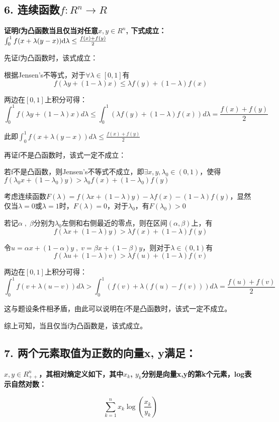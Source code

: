 \documentclass[]{article}
\begin{document}
\hypertarget{header-n106}{%
\subsection{6. 连续函数$f:R^n→R$}\label{header-n106}}

\textbf{证明f为凸函数当且仅当对任意$x,y\in R^n$, 下式成立：$\int_0^1 f(x+\lambda(y-x)){\rm d}\lambda \leq \frac{f(x)+f(y)}{2}$}

先证f为凸函数时，该式成立：

根据Jensen's不等式，对于$\forall \lambda \in[0,1]$有
$$
f(\lambda y +(1-\lambda)x)\leq \lambda f(y) +(1-\lambda)f(x)
$$

两边在$[0,1]$上积分可得：
$$
\int_0^1 f(\lambda y +(1-\lambda)x) d\lambda \leq \int_0^1 (\lambda f(y) +(1-\lambda)f(x))d\lambda=\frac{f(x)+f(y)}{2}
$$

此即$\int_0^1 f(x +\lambda(y-x)) d\lambda \leq \frac{f(x)+f(y)}{2}$

再证f不是凸函数时，该式一定不成立：

若f不是凸函数，则Jensen's不等式不成立，即$\exists x,y,\lambda_0 \in (0,1)$，使得$f(\lambda_0x+(1-\lambda_0)y)>\lambda_0f(x)+(1-\lambda_0)f(y)$

考虑连续函数$F(\lambda)=f(\lambda x+(1-\lambda)y)-\lambda f(x)-(1-\lambda)f(y)$，显然仅当$\lambda=0$或$\lambda=1$时，$F(\lambda)=0$，对于$\lambda_0$，有$F(\lambda_0)>0$

若记$\alpha\;,\;\beta$分别为$\lambda_0$左侧和右侧最近的零点，则在区间$(\alpha,\beta)$上，有
$$
f(\lambda x +(1-\lambda)y)>\lambda f(x) + (1-\lambda)f(y)
$$

令$u=\alpha x +(1-\alpha)y\;,\;v=\beta x+(1-\beta)y$，则对于$\lambda \in (0,1)$有
$$
f(\lambda u +(1-\lambda)v)>\lambda f(u) +(1-\lambda)f(v)
$$

两边在$[0,1]$上积分可得：
$$
\int_0^1 f(v+\lambda (u-v))d\lambda>\int_0^1 (f(v)+\lambda(f(u)-f(v)))d\lambda=\frac{f(u)+f(v)}{2}
$$

这与题设条件相矛盾，由此可以说明在f不是凸函数时，该式一定不成立。

综上可知，当且仅当f为凸函数是，该式成立。

\subsection{7. 两个元素取值为正数的向量x, y满足：}

\textbf{$x,y\in R_{++}^n$，其相对熵定义如下，其中$x_k$, $y_k$分别是向量x,y的第k个元素，log表示自然对数：}

$$
\sum_{k=1}^n x_k \log (\frac{x_k}{y_k})
$$
\end{document}
